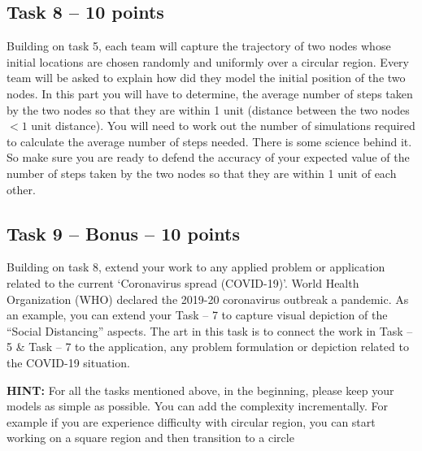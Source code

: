 \documentclass[a4paper, 11pt]{article}
\begin{document}
\subsection {Task 8 -- 10 points}
Building on task 5, each team will capture the trajectory of two nodes whose initial locations are chosen randomly and uniformly over a circular region. Every team will be asked to explain how did they model the initial position of the two nodes. In this part you will have to determine, the average number of steps taken by the two nodes so that they are within 1 unit (distance between the two nodes $< 1$ unit distance). You will need to work out the number of simulations required to calculate the average number of steps needed. There is some science behind it. So make sure you are ready to defend the accuracy of your expected value of the number of steps taken by the two nodes so that they are within 1 unit of each other.

\subsection{Task 9 -- Bonus -- 10 points}
Building on task 8, extend your work to any applied problem or application related to the current ‘Coronavirus spread (COVID-19)’. World Health Organization (WHO) declared the 2019-20 coronavirus outbreak a pandemic. As an example, you can extend your Task -- 7 to capture visual depiction of the “Social Distancing” aspects.  The art in this task is to connect the work in Task -- 5 \& Task -- 7 to the application, any problem formulation or depiction related to the COVID-19 situation.   


\textbf{HINT:} For all the tasks mentioned above, in the beginning, please keep your models as simple as possible. You can add the complexity incrementally. For example if you are experience difficulty with circular region, you can start working on a square region and then transition to a circle
\end{document}
